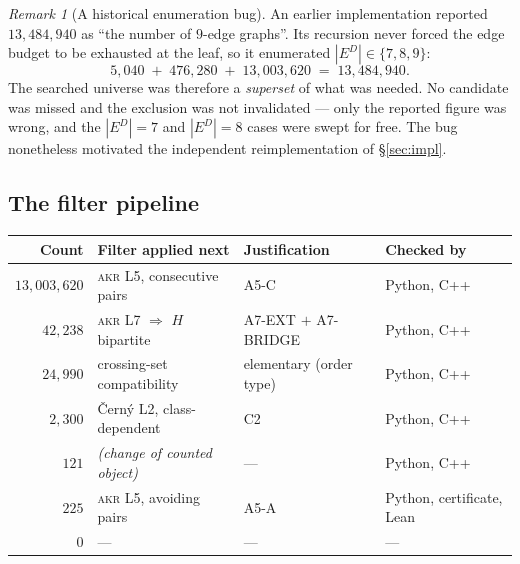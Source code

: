 \documentclass[11pt,a4paper]{article}
\theoremstyle{plain}
\theoremstyle{definition}
\theoremstyle{remark}
\newtheorem*{remark}{Remark}
\newcommand{\ED}{E^{D}}
\begin{document}
\begin{remark}[A historical enumeration bug]\label{rem:bug}
An earlier implementation reported $13{,}484{,}940$ as ``the number of $9$-edge
graphs''. Its recursion never forced the edge budget to be exhausted at the leaf,
so it enumerated $|\ED|\in\{7,8,9\}$:
\[
  5{,}040 \;+\; 476{,}280 \;+\; 13{,}003{,}620 \;=\; 13{,}484{,}940 .
\]
The searched universe was therefore a \emph{superset} of what was needed. No
candidate was missed and the exclusion was not invalidated --- only the reported
figure was wrong, and the $|\ED|=7$ and $|\ED|=8$ cases were swept for free. The
bug nonetheless motivated the independent reimplementation of \S\ref{sec:impl}.
\end{remark}

\subsection{The filter pipeline}

\begin{center}
{\footnotesize
\begin{tabular}{@{}rlll@{}}
\toprule
\textbf{Count} & \textbf{Filter applied next} & \textbf{Justification} & \textbf{Checked by} \\
\midrule
$13{,}003{,}620$ & \textsc{akr} L5, consecutive pairs & \textsf{A5-C} & Python, C++ \\
$42{,}238$       & \textsc{akr} L7 $\Rightarrow$ $H$ bipartite & \textsf{A7-EXT} $+$ \textsf{A7-BRIDGE} & Python, C++ \\
$24{,}990$       & crossing-set compatibility & elementary (order type) & Python, C++ \\
$2{,}300$        & {\v C}ern{\'y} L2, class-dependent & \textsf{C2} & Python, C++ \\
$121$            & \emph{(change of counted object)} & --- & Python, C++ \\
$225$            & \textsc{akr} L5, avoiding pairs & \textsf{A5-A} & Python, certificate, Lean \\
$0$              & --- & --- & --- \\
\bottomrule
\end{tabular}}
\end{center}
\end{document}
